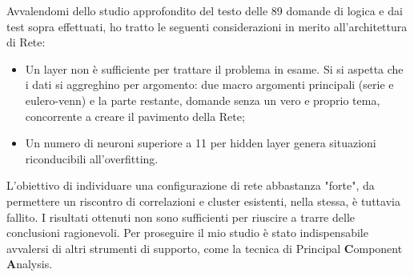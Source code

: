 Avvalendomi dello studio approfondito del testo delle 89 domande di logica e dai test sopra effettuati, ho tratto le seguenti considerazioni in merito all'architettura di Rete:
\begin{itemize}
\item Un layer non \`e sufficiente per trattare il problema in esame. Si si aspetta che i dati si aggreghino per argomento:  due macro argomenti principali (serie e eulero-venn) e la parte restante, domande senza un vero e proprio tema, concorrente a creare il pavimento della Rete;
\item Un numero di neuroni superiore a 11 per hidden layer genera situazioni riconducibili all'overfitting.
\end{itemize}
\noindent
L'obiettivo di individuare una configurazione di rete abbastanza "forte", da permettere un riscontro di correlazioni e cluster esistenti, nella stessa, \`e tuttavia fallito. I risultati ottenuti non sono sufficienti per riuscire a trarre delle conclusioni ragionevoli. Per proseguire il mio studio \`e stato indispensabile avvalersi di altri strumenti di supporto, come la tecnica di {P}rincipal \textbf{C}omponent \textbf{A}nalysis.


